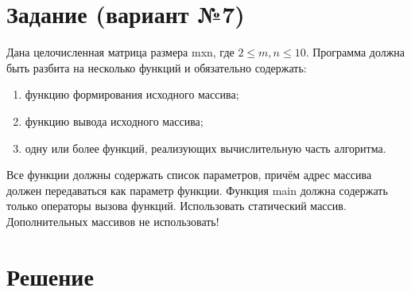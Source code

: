 \documentclass[12pt]{article}
\begin{document}
\section*{Задание (вариант №7)}
Дана целочисленная матрица размера mxn, где $2 \leq m, n \leq 10$.
Программа должна быть разбита на несколько функций и обязательно содержать:
\begin{enumerate}
\item функцию формирования исходного массива;
\item функцию вывода исходного массива;
\item одну или более функций, реализующих вычислительную часть алгоритма.
\end{enumerate}
Все функции должны содержать список параметров, причём адрес массива должен передаваться как параметр функции. Функция
main должна содержать только операторы вызова функций.
Использовать статический массив. Дополнительных массивов не использовать!

\newpage


\section*{Решение}

\end{document}
